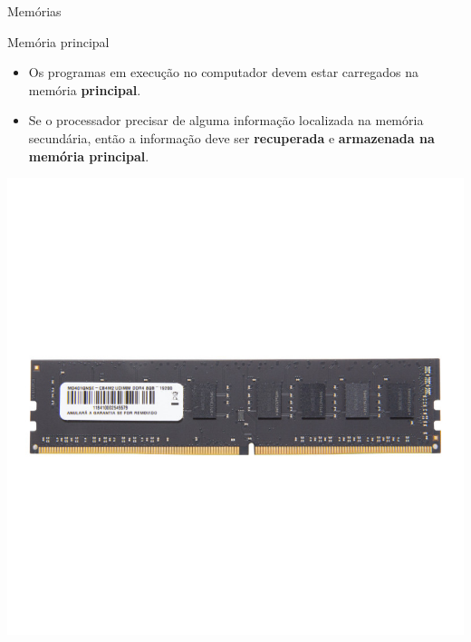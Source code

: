 \begin{frame}{Memórias}
	\begin{block}{Memória principal}
		\begin{itemize}
			\item Os programas em execução no computador devem estar carregados na memória \textbf{principal}.
			\item Se o processador precisar de alguma informação localizada na memória secundária, então a informação deve ser \textbf{recuperada} e \textbf{armazenada na memória principal}.
		\end{itemize}
	\end{block}

	\begin{minipage}{0.49\linewidth}
		\centering
		\includegraphics[width=1\linewidth]{Figuras/Ch02/fig8.1}
	\end{minipage}
	\hfill
	\begin{minipage}{0.49\linewidth}
		\centering

\end{minipage}
\end{frame}
